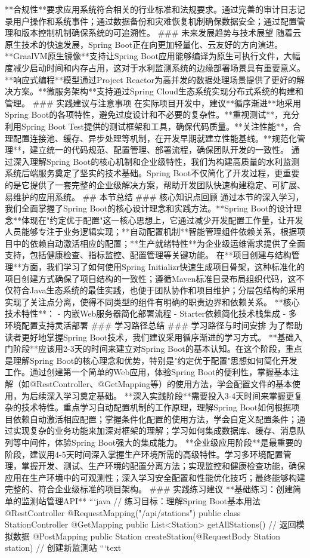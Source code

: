 {{**合规性**要求应用系统符合相关的行业标准和法规要求。通过完善的审计日志记录用户操作和系统事件；通过数据备份和灾难恢复机制确保数据安全；通过配置管理和版本控制机制确保系统的可追溯性。 ### 未来发展趋势与技术展望 随着云原生技术的快速发展，Spring Boot正在向更加轻量化、云友好的方向演进。**GraalVM原生镜像**支持让Spring Boot应用能够编译为原生可执行文件，大幅度减少启动时间和内存占用，这对于水利监测系统的边缘部署场景具有重要意义。**响应式编程**模型通过Project Reactor为高并发的数据处理场景提供了更好的解决方案。**微服务架构**支持通过Spring Cloud生态系统实现分布式系统的构建和管理。 ### 实践建议与注意事项 在实际项目开发中，建议**循序渐进**地采用Spring Boot的各项特性，避免过度设计和不必要的复杂性。**重视测试**，充分利用Spring Boot Test提供的测试框架和工具，确保代码质量。**关注性能**，合理配置连接池、缓存、异步处理等机制，在开发早期就建立性能基线。**规范化管理**，建立统一的代码规范、配置管理、部署流程，确保团队开发的一致性。 通过深入理解Spring Boot的核心机制和企业级特性，我们为构建高质量的水利监测系统后端服务奠定了坚实的技术基础。Spring Boot不仅简化了开发过程，更重要的是它提供了一套完整的企业级解决方案，帮助开发团队快速构建稳定、可扩展、易维护的应用系统。 ## 本节总结 ### 核心知识点回顾 通过本节的深入学习，我们全面掌握了Spring Boot的核心设计理念和实践方法。**Spring Boot的设计理念**体现在"约定优于配置"这一核心思想上，它通过减少开发配置工作量，让开发人员能够专注于业务逻辑实现；**自动配置机制**智能管理组件依赖关系，根据项目中的依赖自动激活相应的配置；**生产就绪特性**为企业级运维需求提供了全面支持，包括健康检查、指标监控、配置管理等关键功能。 在**项目创建与结构管理**方面，我们学习了如何使用Spring Initializr快速生成项目骨架，这种标准化的项目创建方式确保了项目结构的一致性；遵循Maven标准目录布局组织代码，这不仅符合Java生态系统的最佳实践，也便于团队协作和项目维护；分层包结构的采用实现了关注点分离，使得不同类型的组件有明确的职责边界和依赖关系。 **核心技术特性**： - 内嵌Web服务器简化部署流程 - Starter依赖简化技术栈集成 - 多环境配置支持灵活部署 ### 学习路径总结 ### 学习路径与时间安排 为了帮助读者更好地掌握Spring Boot技术，我们建议采用循序渐进的学习方式。 **基础入门阶段**应该用2-3天的时间来建立对Spring Boot的基本认知。在这个阶段，重点是理解Spring Boot的核心理念和优势，特别是"约定优于配置"思想如何简化开发工作。通过创建第一个简单的Web应用，体验Spring Boot的便利性，掌握基本注解（如@RestController、@GetMapping等）的使用方法，学会配置文件的基本使用，为后续深入学习奠定基础。 **深入实践阶段**需要投入3-4天时间来掌握更复杂的技术特性。重点学习自动配置机制的工作原理，理解Spring Boot如何根据项目依赖自动激活相应配置；掌握条件化配置的使用方法，学会自定义配置条件；通过实现复杂的业务功能来加深对框架的理解；学习如何集成数据库、缓存、消息队列等中间件，体验Spring Boot强大的集成能力。 **企业级应用阶段**是最重要的阶段，建议用4-5天时间深入掌握生产环境所需的高级特性。学习多环境配置管理，掌握开发、测试、生产环境的配置分离方法；实现监控和健康检查功能，确保应用在生产环境中的可观测性；深入学习安全配置和性能优化技巧；最终能够构建完整的、符合企业级标准的项目架构。 ### 实践练习建议 **基础练习：创建简单的监测站管理API** ```java // 练习目标：理解Spring Boot基本用法 @RestController @RequestMapping("/api/stations") public class StationController { @GetMapping public List<Station> getAllStations() { // 返回模拟数据 } @PostMapping public Station createStation(@RequestBody Station station) { // 创建新监测站 } } ```text }}
